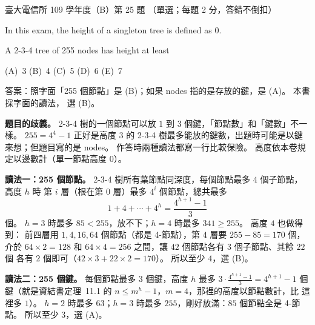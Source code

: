 \begin{pastexam}[label={px:ntu-109-comm-dsa-25}]{臺大電信所 109 學年度（B）第 25 題}
（單選；每題 2 分，答錯不倒扣）

In this exam, the height of a singleton tree is defined as 0.

A 2-3-4 tree of 255 nodes has height at least

(A)~3 \qquad (B)~4 \qquad (C)~5 \qquad (D)~6 \qquad (E)~7
\end{pastexam}

\begin{pastsoln}
答案：照字面「255 個節點」是 (B)；如果 nodes 指的是存放的鍵，是 (A)。 本書採字面的讀法，
選 (B)。

\textbf{題目的歧義。} 2-3-4 樹的一個節點可以放 $1$ 到 $3$ 個鍵，「節點數」和「鍵數」不一樣。
$255 = 4^4 - 1$ 正好是高度 $3$ 的 2-3-4 樹最多能放的鍵數，出題時可能是以鍵來想；但題目寫的是
nodes。 作答時兩種讀法都寫一行比較保險。 高度依本卷規定以邊數計（單一節點高度 $0$）。

\textbf{讀法一：255 個節點。} 2-3-4 樹所有葉節點同深度，每個節點最多 $4$ 個子節點，高度 $h$ 時
第 $i$ 層（根在第 $0$ 層）最多 $4^i$ 個節點，總共最多
\[
1 + 4 + \cdots + 4^h = \frac{4^{h+1} - 1}{3}
\]
個。 $h = 3$ 時最多 $85 < 255$，放不下；$h = 4$ 時最多 $341 \ge 255$。 高度 $4$ 也做得到：
前四層用 $1, 4, 16, 64$ 個節點（都是 4-節點），第 $4$ 層要 $255 - 85 = 170$ 個，介於
$64 \times 2 = 128$ 和 $64 \times 4 = 256$ 之間，讓 $42$ 個節點各有 $3$ 個子節點、其餘 $22$ 個
各有 $2$ 個即可（$42 \times 3 + 22 \times 2 = 170$）。 所以至少 $4$，選 (B)。

\textbf{讀法二：255 個鍵。} 每個節點最多 $3$ 個鍵，高度 $h$ 最多 $3 \cdot \frac{4^{h+1} - 1}{3} =
4^{h+1} - 1$ 個鍵（就是資結書定理~11.1 的 $n \le m^h - 1$，$m = 4$，那裡的高度以節點數計，比
這裡多 $1$）。 $h = 2$ 時最多 $63$；$h = 3$ 時最多 $255$，剛好放滿：$85$ 個節點全是 4-節點。
所以至少 $3$，選 (A)。
\end{pastsoln}
